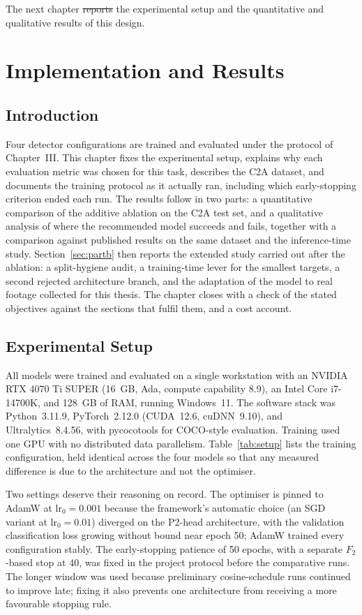 \documentclass[12pt,a4paper,oneside]{report}
\providecommand{\DIFadd}[1]{{\protect\color{blue}\uwave{#1}}} %
\providecommand{\DIFdel}[1]{{\protect\color{red}\sout{#1}}}                      %
\providecommand{\DIFaddbegin}{} %
\providecommand{\DIFaddend}{} %
\providecommand{\DIFdelbegin}{} %
\providecommand{\DIFdelend}{} %
\begin{document}
\DIFaddend The next chapter \DIFdelbegin \DIFdel{reports }\DIFdelend \DIFaddbegin \DIFadd{fixes }\DIFaddend the experimental setup and the \DIFaddbegin \DIFadd{evaluation protocol, then
reports the }\DIFaddend quantitative and qualitative results of this design.
 \newpage 
 \newpage \chapter{Implementation and Results}

\section{Introduction}
Four detector configurations are trained and evaluated under the protocol of
Chapter~III. This chapter fixes the experimental
setup, explains why each evaluation metric was chosen for this task, describes
the C2A dataset, and documents the training protocol as it actually ran,
including which early-stopping criterion ended each run. The results follow in
two parts: a quantitative comparison of the additive ablation on the C2A test
set, and a qualitative analysis of where the recommended model succeeds and
fails, together with a comparison against published results on the same
dataset and the inference-time study. Section~\ref{sec:partb} then reports the
extended study carried out after the ablation: a split-hygiene audit, a
training-time lever for the smallest targets, a second rejected architecture
branch, and the adaptation of the model to real footage collected for this
thesis. The chapter closes with a check of the stated objectives against the
sections that fulfil them, and a cost account.

\section{Experimental Setup}
\label{sec:setup}
All models were trained and evaluated on a single workstation with an NVIDIA
RTX 4070 Ti SUPER (16~GB, Ada, compute capability 8.9), an Intel Core
i7-14700K, and 128~GB of RAM, running Windows~11. The software stack was
Python~3.11.9, PyTorch~2.12.0 (CUDA~12.6, cuDNN~9.10), and Ultralytics~8.4.56,
with pycocotools for COCO-style evaluation. Training used one GPU with no
distributed data parallelism. Table~\ref{tab:setup} lists the training
configuration, held identical across the four models so that any measured
difference is due to the architecture and not the optimiser.

Two settings deserve their reasoning on record. The optimiser is pinned to
AdamW at $\text{lr}_0 = 0.001$ because the framework's automatic choice
(an SGD variant at $\text{lr}_0 = 0.01$) diverged on the P2-head
architecture, with the validation classification loss growing without bound
near epoch 50; AdamW trained every configuration stably. The early-stopping
patience of 50 epochs, with a separate $F_2$-based stop at 40, was fixed in
the project protocol before the comparative runs. The longer window was used
because preliminary cosine-schedule runs continued to improve late; fixing it
also prevents one architecture from receiving a more favourable stopping rule.
\end{document}
